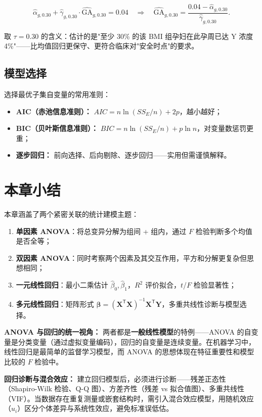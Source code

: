\begin{equation}
    \hat{\alpha}_{g,0.30} + \hat{\gamma}_{g,0.30} \cdot \widehat{\mathrm{GA}}_{g,0.30} = 0.04
    \quad\Longrightarrow\quad
    \widehat{\mathrm{GA}}_{g,0.30} = \frac{0.04 - \hat{\alpha}_{g,0.30}}{\hat{\gamma}_{g,0.30}}.
\end{equation}

取 $\tau = 0.30$ 的含义：估计的是"至少 30\% 的该 BMI 组孕妇在此孕周已达 Y 浓度 4\%"——比均值回归更保守、更符合临床对"安全时点"的要求。

\subsection{模型选择}

选择最优子集自变量的常用准则：
\begin{itemize}
    \item \textbf{AIC（赤池信息准则）：} $AIC = n\ln(SS_E/n) + 2p$，越小越好；
    \item \textbf{BIC（贝叶斯信息准则）：} $BIC = n\ln(SS_E/n) + p\ln n$，对变量数惩罚更重；
    \item \textbf{逐步回归：} 前向选择、后向剔除、逐步回归——实用但需谨慎解释。
\end{itemize}

\section*{本章小结}

本章涵盖了两个紧密关联的统计建模主题：

\begin{enumerate}
    \item \textbf{单因素 ANOVA}：将总变异分解为组间 + 组内，通过 $F$ 检验判断多个均值是否全等；
    \item \textbf{双因素 ANOVA}：同时考察两个因素及其交互作用，平方和分解更复杂但思想相同；
    \item \textbf{一元线性回归}：最小二乘估计 $\hat{\beta}_0, \hat{\beta}_1$，$R^2$ 评价拟合，$t$/$F$ 检验显著性；
    \item \textbf{多元线性回归}：矩阵形式 $\hat{\bm{\beta}} = (\bm{X}^{\mathsf{T}}\bm{X})^{-1}\bm{X}^{\mathsf{T}}\bm{Y}$，多重共线性诊断与模型选择。
\end{enumerate}

\textbf{ANOVA 与回归的统一视角：} 两者都是\textbf{一般线性模型}的特例——ANOVA 的自变量是分类变量（通过虚拟变量编码），回归的自变量是连续变量。在机器学习中，线性回归是最简单的监督学习模型，而 ANOVA 的思想体现在特征重要性和模型比较的 $F$ 检验中。

\textbf{回归诊断与混合效应：} 建立回归模型后，必须进行诊断——残差正态性（Shapiro-Wilk 检验、Q-Q 图）、方差齐性（残差 vs 拟合值图）、多重共线性（VIF）。当数据存在重复测量或嵌套结构时，需引入混合效应模型，用随机效应（$u_i$）区分个体差异与系统性效应，避免标准误低估。

